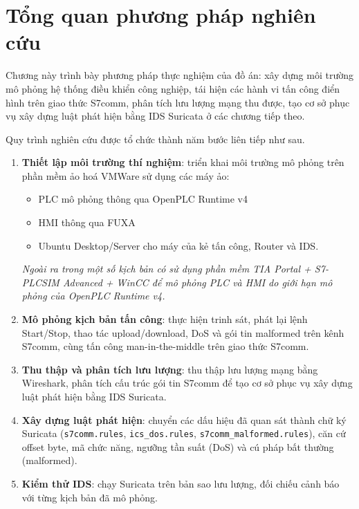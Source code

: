 \documentclass[../main.tex]{subfiles}
\begin{document}
\section{Tổng quan phương pháp nghiên cứu}
\label{sec:methodology-overview}

Chương này trình bày phương pháp thực nghiệm của đồ án: xây dựng môi trường mô phỏng hệ thống điều khiển công nghiệp, tái hiện các hành vi tấn công điển hình trên giao thức S7comm, phân tích lưu lượng mạng thu được, tạo cơ sở phục vụ xây dựng luật phát hiện bằng IDS Suricata ở các chương tiếp theo.

Quy trình nghiên cứu được tổ chức thành năm bước liên tiếp như sau.

\begin{enumerate}
    \item \textbf{Thiết lập môi trường thí nghiệm}: triển khai môi trường mô phỏng trên phần mềm ảo hoá VMWare sử dụng các máy ảo:
    \begin{itemize}
        \item PLC mô phỏng thông qua OpenPLC Runtime v4
        \item HMI thông qua FUXA
        \item Ubuntu Desktop/Server cho máy của kẻ tấn công, Router và IDS.
    \end{itemize}

    \textit{Ngoài ra trong một số kịch bản có sử dụng phần mềm TIA Portal + S7-PLCSIM Advanced + WinCC để mô phỏng PLC và HMI do giới hạn mô phỏng của OpenPLC Runtime v4.}
  
    \item \textbf{Mô phỏng kịch bản tấn công}: thực hiện trinh sát, phát lại lệnh Start/Stop, thao tác upload/download, DoS và gói tin malformed trên kênh S7comm, cùng tấn công man-in-the-middle trên giao thức S7comm.
    
    \item \textbf{Thu thập và phân tích lưu lượng}: thu thập lưu lượng mạng bằng Wireshark, phân tích cấu trúc gói tin S7comm để tạo cơ sở phục vụ xây dựng luật phát hiện bằng IDS Suricata.
    
    \item \textbf{Xây dựng luật phát hiện}: chuyển các dấu hiệu đã quan sát thành chữ ký Suricata (\texttt{s7comm.rules}, \texttt{ics\_dos.rules}, \texttt{s7comm\_malformed.rules}), căn cứ offset byte, mã chức năng, ngưỡng tần suất (DoS) và cú pháp bất thường (malformed).
    
    \item \textbf{Kiểm thử IDS}: chạy Suricata trên bản sao lưu lượng, đối chiếu cảnh báo với từng kịch bản đã mô phỏng.
    
\end{enumerate}
\end{document}
